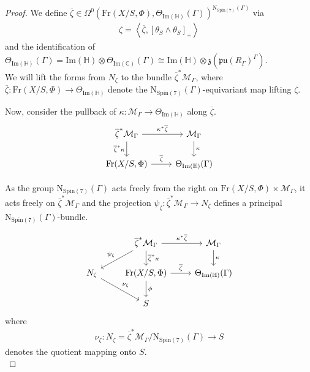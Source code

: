 \documentclass[psamsfonts]{amsart}
\theoremstyle{plain}
\theoremstyle{definition}{
\newtheorem{defi}{Definition}[section]
\newtheorem{ass}{Assumption}
\newtheorem*{nota}{Notation}}
\theoremstyle{remark}{
\newtheorem{rem}{Remark}
\newtheorem{ex}{Example}}
\theoremstyle{plain}{
\newtheorem{thm}{Theorem}[section]
\newtheorem{lem}{Lemma}[section]
\newtheorem{cor}{Corollary}[section]
\newtheorem{prop}{Proposition}[section]
\newtheorem{con}{Conjecture}[section]}
\newcommand{\m}[1]{{\mathrm{#1}}}
\begin{document}
\begin{proof}
We define $\overline{\zeta}\in\Omega^0(\m{Fr}(X/S,\Phi),\Theta_{\m{Im}(\mathbb{H})}(\Gamma))^{\m{N}_{\m{Spin}(7)}(\Gamma)}$ via 
\begin{align*}
    \zeta=\left<\overline{\zeta},\left[\theta_{S}\wedge\theta_S\right]_+\right>
\end{align*}
and the identification of $\Theta_{\m{Im}(\mathbb{H})}(\Gamma)=\m{Im}(\mathbb{H})\otimes\Theta_{\m{Im}(\mathbb{C})}(\Gamma)\cong \m{Im}(\mathbb{H})\otimes \mathfrak{z}(\mathfrak{pu}(R_\Gamma)^{\Gamma})$.\\

We will lift the forms from $N_\zeta$ to the bundle $\overline{\zeta}^*\mathcal{M}_\Gamma$, where $\overline{\zeta}\colon \m{Fr}(X/S,\Phi)\rightarrow \Theta_{\m{Im}(\mathbb{H})}$ denote the $\m{N}_{\m{Spin}(7)}(\Gamma)$-equivariant map lifting $\zeta$.


Now, consider the pullback of $\kappa \colon\mathcal{M}_\Gamma\rightarrow \Theta_{\m{Im}(\mathbb{H})}$ along $\overline{\zeta}$.
    \begin{equation*}
         \begin{tikzcd}
            \overline{\zeta}^*\mathcal{M}_\Gamma\arrow[r,"\kappa^*\overline{\zeta}"]\arrow[d,swap,"\overline{\zeta}^*\kappa"]&\mathcal{M}_\Gamma\arrow[d,"\kappa"]\\
            \m{Fr}(X/S,\Phi)\arrow[r,"\overline{\zeta}"]&\Theta_{\m{Im}(\mathbb{H})}(\Gamma)
        \end{tikzcd}
    \end{equation*}

As the group $\m{N}_{\m{Spin}(7)}(\Gamma)$ acts freely from the right on $\m{Fr}(X/S,\Phi)\times \mathcal{M}_\Gamma$, it acts freely on $\overline{\zeta}^*\mathcal{M}_\Gamma$ and the projection $\psi_\zeta \colon\overline{\zeta}^*\mathcal{M}_\Gamma\rightarrow N_\zeta$ defines a principal $\m{N}_{\m{Spin}(7)}(\Gamma)$-bundle.

\begin{equation*}
    \begin{tikzcd}
        &\overline{\zeta}^*\mathcal{M}_\Gamma\arrow[dl,swap,"\psi_\zeta"]\arrow[r,"\kappa^*\overline{\zeta}"]\arrow[d,"\overline{\zeta}^*\kappa"]&\mathcal{M}_\Gamma\arrow[d,"\kappa"]\\
        N_\zeta\arrow[dr,"\nu_\zeta"]&\m{Fr}(X/S,\Phi)\arrow[r,"\overline{\zeta}"]\arrow[d,"\phi"]&\Theta_{\m{Im}(\mathbb{H})}(\Gamma)\\
        &S&
    \end{tikzcd}
\end{equation*}
where 
\begin{align*}
    \nu_\zeta\colon N_\zeta=\overline{\zeta}^*\mathcal{M}_\Gamma/\m{N}_{\m{Spin}(7)}(\Gamma)\rightarrow S
\end{align*}
denotes the quotient mapping onto $S$.\\


\end{proof}
\end{document}
